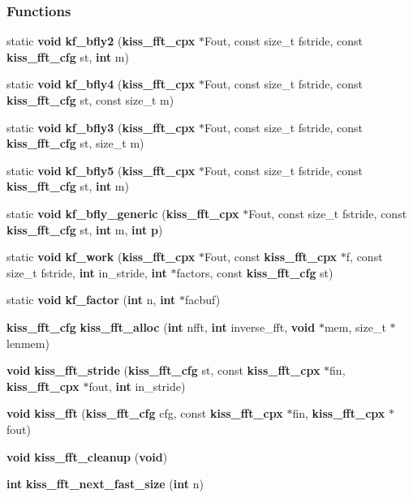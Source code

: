 \subsubsection*{Functions}
\begin{DoxyCompactItemize}
\item 
static {\bf void} {\bf kf\+\_\+bfly2} ({\bf kiss\+\_\+fft\+\_\+cpx} $\ast$Fout, const size\+\_\+t fstride, const {\bf kiss\+\_\+fft\+\_\+cfg} st, {\bf int} m)
\item 
static {\bf void} {\bf kf\+\_\+bfly4} ({\bf kiss\+\_\+fft\+\_\+cpx} $\ast$Fout, const size\+\_\+t fstride, const {\bf kiss\+\_\+fft\+\_\+cfg} st, const size\+\_\+t m)
\item 
static {\bf void} {\bf kf\+\_\+bfly3} ({\bf kiss\+\_\+fft\+\_\+cpx} $\ast$Fout, const size\+\_\+t fstride, const {\bf kiss\+\_\+fft\+\_\+cfg} st, size\+\_\+t m)
\item 
static {\bf void} {\bf kf\+\_\+bfly5} ({\bf kiss\+\_\+fft\+\_\+cpx} $\ast$Fout, const size\+\_\+t fstride, const {\bf kiss\+\_\+fft\+\_\+cfg} st, {\bf int} m)
\item 
static {\bf void} {\bf kf\+\_\+bfly\+\_\+generic} ({\bf kiss\+\_\+fft\+\_\+cpx} $\ast$Fout, const size\+\_\+t fstride, const {\bf kiss\+\_\+fft\+\_\+cfg} st, {\bf int} m, {\bf int} {\bf p})
\item 
static {\bf void} {\bf kf\+\_\+work} ({\bf kiss\+\_\+fft\+\_\+cpx} $\ast$Fout, const {\bf kiss\+\_\+fft\+\_\+cpx} $\ast$f, const size\+\_\+t fstride, {\bf int} in\+\_\+stride, {\bf int} $\ast$factors, const {\bf kiss\+\_\+fft\+\_\+cfg} st)
\item 
static {\bf void} {\bf kf\+\_\+factor} ({\bf int} n, {\bf int} $\ast$facbuf)
\item 
{\bf kiss\+\_\+fft\+\_\+cfg} {\bf kiss\+\_\+fft\+\_\+alloc} ({\bf int} nfft, {\bf int} inverse\+\_\+fft, {\bf void} $\ast$mem, size\+\_\+t $\ast$lenmem)
\item 
{\bf void} {\bf kiss\+\_\+fft\+\_\+stride} ({\bf kiss\+\_\+fft\+\_\+cfg} st, const {\bf kiss\+\_\+fft\+\_\+cpx} $\ast$fin, {\bf kiss\+\_\+fft\+\_\+cpx} $\ast$fout, {\bf int} in\+\_\+stride)
\item 
{\bf void} {\bf kiss\+\_\+fft} ({\bf kiss\+\_\+fft\+\_\+cfg} cfg, const {\bf kiss\+\_\+fft\+\_\+cpx} $\ast$fin, {\bf kiss\+\_\+fft\+\_\+cpx} $\ast$fout)
\item 
{\bf void} {\bf kiss\+\_\+fft\+\_\+cleanup} ({\bf void})
\item 
{\bf int} {\bf kiss\+\_\+fft\+\_\+next\+\_\+fast\+\_\+size} ({\bf int} n)
\end{DoxyCompactItemize}


